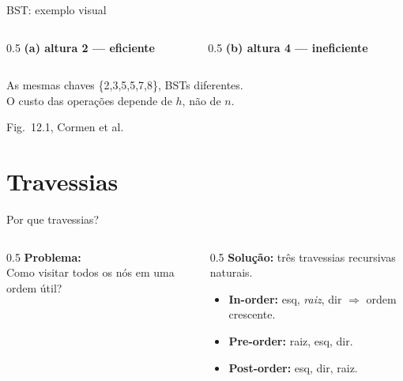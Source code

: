 \documentclass[aspectratio=169]{beamer}
\begin{document}
\begin{frame}{BST: exemplo visual}
\begin{columns}[T]
\begin{column}{0.5\textwidth}
\centering\textbf{(a) altura 2 --- eficiente}\\[4pt]
\end{column}
\begin{column}{0.5\textwidth}
\centering\textbf{(b) altura 4 --- ineficiente}\\[4pt]
\end{column}
\end{columns}
\vspace{4pt}
\begin{center}\small As mesmas chaves \{2,3,5,5,7,8\}, BSTs diferentes.\\
O custo das operações depende de $h$, não de $n$.\end{center}
\hfill\tiny{Fig.\ 12.1, Cormen et al.}
\end{frame}

\section{Travessias}

\begin{frame}{Por que travessias?}
\begin{columns}[T]
\begin{column}{0.5\textwidth}
\textbf{Problema:}\\
Como visitar todos os nós em uma ordem útil?
\end{column}
\begin{column}{0.5\textwidth}
\textbf{Solução:} três travessias recursivas naturais.
\begin{itemize}
  \item \textbf{In-order:} esq, \emph{raiz}, dir \;$\Rightarrow$ ordem crescente.
  \item \textbf{Pre-order:} raiz, esq, dir.
  \item \textbf{Post-order:} esq, dir, raiz.
\end{itemize}
\end{column}
\end{columns}
\end{frame}
\end{document}
